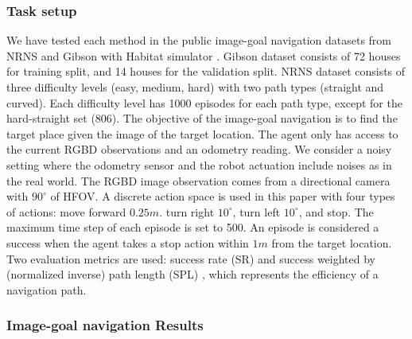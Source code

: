 \documentclass[10pt,twocolumn,letterpaper]{article}
\begin{document}
\subsubsection{Task setup}
\vspace{-0.2cm}
We have tested each method in the public image-goal navigation datasets from NRNS\cite{NRNS} and Gibson \cite{xiazamirhe2018gibsonenv} with Habitat simulator \cite{habitat}. 
%
Gibson dataset consists of 72 houses for training split, and 14 houses for the validation split.
%
NRNS dataset consists of three difficulty levels (easy, medium, hard) with two path types (straight and curved).
%
Each difficulty level has 1000 episodes for each path type, except for the hard-straight set (806).
%
The objective of the image-goal navigation is to find the target place given the image of the target location. 
%
The agent only has access to the current RGBD observations and an odometry reading. 
%
We consider a noisy setting \cite{occ_ans} where the odometry sensor and the robot actuation include noises as in the real world.
%
The RGBD image observation comes from a directional camera with $90^\circ$ of HFOV. 
%
A discrete action space is used in this paper with four types of actions: move forward $0.25m$. turn right $10^\circ$, turn left $10^\circ$, and stop. 
%
The maximum time step of each episode is set to 500. 
%
An episode is considered a success when the agent takes a stop action within $1m$ from the target location.
% 
Two evaluation metrics are used: success rate (SR) and success weighted by (normalized inverse) path length (SPL) \cite{SPL}, which represents the efficiency of a navigation path.

\vspace{-0.3cm}
\subsubsection{Image-goal navigation Results}
%
\end{document}
